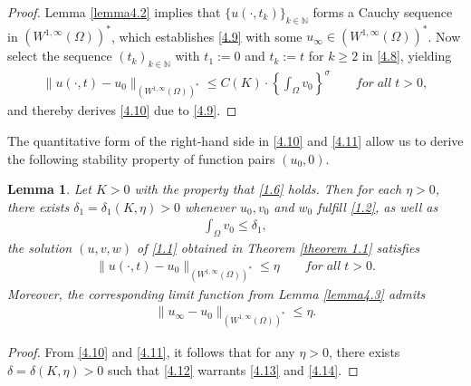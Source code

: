 \documentclass[12pt]{article}
\theoremstyle{plain}
\newtheorem{lemma}{Lemma}[section]
\theoremstyle{definition}
\numberwithin{equation}{section}
\begin{document}
\begin{proof}
    Lemma \ref{lemma4.2} implies that $\{u(\cdot,t_{k})\}_{k\in \mathbb{N}}$ forms a Cauchy sequence in $(W^{1,\infty}(\Omega))^*$, which establishes \eqref{4.9} with some $u_{\infty}\in(W^{1,\infty}(\Omega))^*$. Now select the sequence $(t_{k})_{k\in \mathbb{N}}$ with $t_1:=0$ and $t_k:=t$ for $k\geq 2$ in \eqref{4.8}, yielding
    \begin{align}\label{4.11}
        \|u(\cdot,t)-u_0\|_{(W^{1,\infty}(\Omega))^*}\leq C(K)\cdot \left\{\int_\Omega v_{0}\right\}^{\sigma}\qquad for \;all\; t>0,
\end{align}
and thereby derives \eqref{4.10} due to \eqref{4.9}.
\end{proof}

The quantitative form of the right-hand side in \eqref{4.10} and \eqref{4.11} allow us to derive the following stability property  of function pairs $(u_0,0)$.
\begin{lemma}\label{lemma4.4}
Let $K>0$ with the property that \eqref{1.6} holds.  Then for each $\eta>0$, there exists $\delta_1=\delta_1(K,\eta)>0$ whenever $u_0, v_0$ and $w_0$ fulfill
\eqref{1.2}, as well as
\begin{align}\label{4.12}
    \int_{\Omega}v_0\leq \delta_1,
\end{align}
the solution $(u,v,w)$ of \eqref{1.1} obtained in Theorem \ref{theorem 1.1} satisfies
\begin{align}\label{4.13}
    \|u(\cdot,t)-u_0\|_{(W^{1,\infty}(\Omega))^*}\leq \eta\qquad for \;all\; t>0.
\end{align}
Moreover, the corresponding limit function  from Lemma \ref{lemma4.3} admits
\begin{align}\label{4.14}
   \|u_{\infty}-u_0\|_{(W^{1,\infty}(\Omega))^*}\leq \eta.
\end{align}
\end{lemma}
\begin{proof}
   From \eqref{4.10} and \eqref{4.11}, it follows that for any $\eta>0$,  there exists $\delta=\delta(K,\eta)>0$ such that \eqref{4.12} warrants \eqref{4.13} and \eqref{4.14}.
\end{proof}
\end{document}

